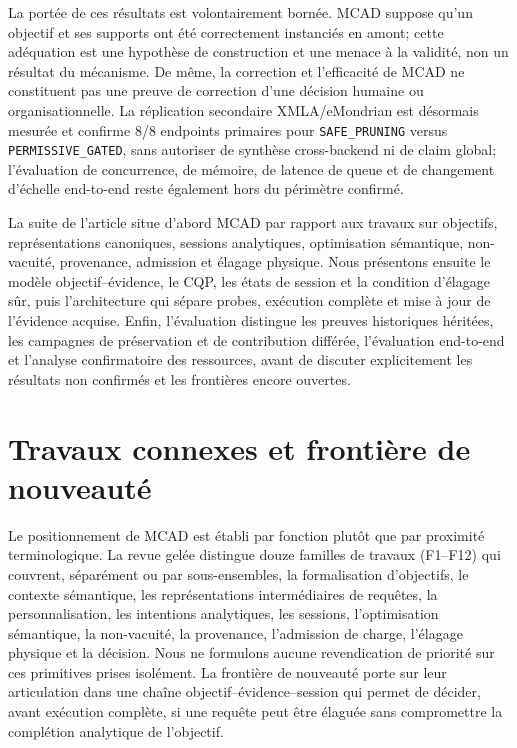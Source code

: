 \documentclass[journal]{IEEEtran}
\begin{document}
La portée de ces résultats est volontairement bornée. MCAD suppose qu'un objectif et ses supports ont été correctement instanciés en amont; cette adéquation est une hypothèse de construction et une menace à la validité, non un résultat du mécanisme. De même, la correction et l'efficacité de MCAD ne constituent pas une preuve de correction d'une décision humaine ou organisationnelle. La réplication secondaire XMLA/eMondrian est désormais mesurée et confirme 8/8 endpoints primaires pour \texttt{SAFE\_PRUNING} versus \texttt{PERMISSIVE\_GATED}, sans autoriser de synthèse cross-backend ni de claim global; l'évaluation de concurrence, de mémoire, de latence de queue et de changement d'échelle end-to-end reste également hors du périmètre confirmé.

La suite de l'article situe d'abord MCAD par rapport aux travaux sur objectifs, représentations canoniques, sessions analytiques, optimisation sémantique, non-vacuité, provenance, admission et élagage physique. Nous présentons ensuite le modèle objectif--évidence, le CQP, les états de session et la condition d'élagage sûr, puis l'architecture qui sépare probes, exécution complète et mise à jour de l'évidence acquise. Enfin, l'évaluation distingue les preuves historiques héritées, les campagnes de préservation et de contribution différée, l'évaluation end-to-end et l'analyse confirmatoire des ressources, avant de discuter explicitement les résultats non confirmés et les frontières encore ouvertes.


\section{Travaux connexes et frontière de nouveauté}
\label{sec:related}

Le positionnement de MCAD est établi par fonction plutôt que par proximité terminologique. La revue gelée distingue douze familles de travaux (F1--F12) qui couvrent, séparément ou par sous-ensembles, la formalisation d'objectifs, le contexte sémantique, les représentations intermédiaires de requêtes, la personnalisation, les intentions analytiques, les sessions, l'optimisation sémantique, la non-vacuité, la provenance, l'admission de charge, l'élagage physique et la décision. Nous ne formulons aucune revendication de priorité sur ces primitives prises isolément. La frontière de nouveauté porte sur leur articulation dans une chaîne objectif--évidence--session qui permet de décider, avant exécution complète, si une requête peut être élaguée sans compromettre la complétion analytique de l'objectif.
\end{document}
